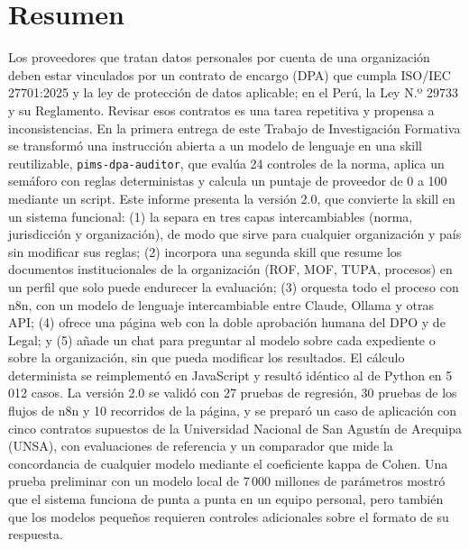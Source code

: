 \documentclass[12pt,letterpaper]{article}
\begin{document}
\setcounter{page}{2}

\section*{Resumen}

\noindent Los proveedores que tratan datos personales por cuenta de una organización deben estar vinculados por un contrato de encargo (DPA) que cumpla ISO/IEC 27701:2025 y la ley de protección de datos aplicable; en el Perú, la Ley N.º 29733 y su Reglamento. Revisar esos contratos es una tarea repetitiva y propensa a inconsistencias. En la primera entrega de este Trabajo de Investigación Formativa se transformó una instrucción abierta a un modelo de lenguaje en una skill reutilizable, \texttt{pims-dpa-auditor}, que evalúa 24 controles de la norma, aplica un semáforo con reglas deterministas y calcula un puntaje de proveedor de 0 a 100 mediante un script. Este informe presenta la versión 2.0, que convierte la skill en un sistema funcional: (1) la separa en tres capas intercambiables (norma, jurisdicción y organización), de modo que sirve para cualquier organización y país sin modificar sus reglas; (2) incorpora una segunda skill que resume los documentos institucionales de la organización (ROF, MOF, TUPA, procesos) en un perfil que solo puede endurecer la evaluación; (3) orquesta todo el proceso con n8n, con un modelo de lenguaje intercambiable entre Claude, Ollama y otras API; (4) ofrece una página web con la doble aprobación humana del DPO y de Legal; y (5) añade un chat para preguntar al modelo sobre cada expediente o sobre la organización, sin que pueda modificar los resultados. El cálculo determinista se reimplementó en JavaScript y resultó idéntico al de Python en 5\,012 casos. La versión 2.0 se validó con 27 pruebas de regresión, 30 pruebas de los flujos de n8n y 10 recorridos de la página, y se preparó un caso de aplicación con cinco contratos supuestos de la Universidad Nacional de San Agustín de Arequipa (UNSA), con evaluaciones de referencia y un comparador que mide la concordancia de cualquier modelo mediante el coeficiente kappa de Cohen. Una prueba preliminar con un modelo local de 7\,000 millones de parámetros mostró que el sistema funciona de punta a punta en un equipo personal, pero también que los modelos pequeños requieren controles adicionales sobre el formato de su respuesta.
\end{document}
